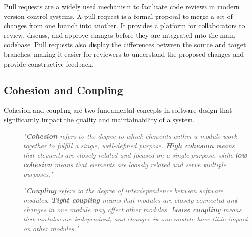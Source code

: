 Pull requests are a widely used mechanism to facilitate code reviews in modern version control systems. A pull request is a formal proposal to merge a set of changes from one branch into another. It provides a platform for collaborators to review, discuss, and approve changes before they are integrated into the main codebase. Pull requests also display the differences between the source and target branches, making it easier for reviewers to understand the proposed changes and provide constructive feedback. \cite{github:pr}

\subsection{Cohesion and Coupling}
\label{subsec:cohesion-and-coupling}

Cohesion and coupling are two fundamental concepts in software design that significantly impact the quality and maintainability of a system. \\

\begin{quote}
\textit{"\textbf{Cohesion} refers to the degree to which elements within a module work together to fulfill a single, well-defined purpose. \textbf{High cohesion} means that elements are closely related and focused on a single purpose, while \textbf{low cohesion} means that elements are loosely related and serve multiple purposes."} \cite{geeksforgeeks:c&c} \\
\end{quote}

\begin{quote}
\textit{"\textbf{Coupling} refers to the degree of interdependence between software modules. \textbf{Tight coupling} means that modules are closely connected and changes in one module may affect other modules. \textbf{Loose coupling} means that modules are independent, and changes in one module have little impact on other modules."} \cite{geeksforgeeks:c&c} \\
\end{quote}

